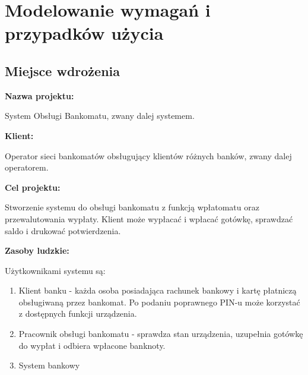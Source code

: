 \documentclass[10pt,a4paper]{article}
\begin{document}
\renewcommand{\figurename}{Rys.}
\renewcommand{\lstlistingname}{Kod źródłowy}

\renewcommand{\contentsname}{\makebox[\textwidth][c]{Spis treści}}
\renewcommand{\cfttoctitlefont}{\Large\bfseries}
\renewcommand{\cftaftertoctitle}{}
\tableofcontents
\newpage

\justifying
\frenchspacing






\section{Modelowanie wymagań i przypadków użycia}

\subsection{Miejsce wdrożenia}

\noindent\textbf{Nazwa projektu:}

System Obsługi Bankomatu, zwany dalej systemem.

\medskip
\noindent\textbf{Klient:}

Operator sieci bankomatów obsługujący klientów różnych banków, zwany dalej operatorem.

\medskip
\noindent\textbf{Cel projektu:}

Stworzenie systemu do obsługi bankomatu z funkcją wpłatomatu oraz przewalutowania wypłaty. Klient może wypłacać i wpłacać gotówkę, sprawdzać saldo i drukować potwierdzenia.

\medskip
\noindent\textbf{Zasoby ludzkie:}

Użytkownikami systemu są:
\begin{enumerate}
    \item Klient banku - każda osoba posiadająca rachunek bankowy i kartę płatniczą obsługiwaną przez bankomat. Po podaniu poprawnego PIN-u może korzystać z dostępnych funkcji urządzenia.
    \item Pracownik obsługi bankomatu - sprawdza stan urządzenia, uzupełnia gotówkę do wypłat i odbiera wpłacone banknoty.
    \item System bankowy
\end{enumerate}
\end{document}

